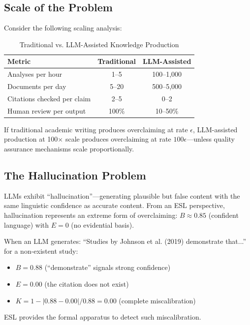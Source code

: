 \documentclass[11pt,a4paper]{article}
\begin{document}
\subsection{Scale of the Problem}

Consider the following scaling analysis:

\begin{table}[h]
\centering
\caption{Traditional vs. LLM-Assisted Knowledge Production}
\label{tab:scale}
\begin{tabular}{lcc}
\toprule
\textbf{Metric} & \textbf{Traditional} & \textbf{LLM-Assisted} \\
\midrule
Analyses per hour & 1--5 & 100--1,000 \\
Documents per day & 5--20 & 500--5,000 \\
Citations checked per claim & 2--5 & 0--2 \\
Human review per output & 100\% & 10--50\% \\
\bottomrule
\end{tabular}
\end{table}

If traditional academic writing produces overclaiming at rate $\epsilon$, LLM-assisted production at 100$\times$ scale produces overclaiming at rate $100\epsilon$---unless quality assurance mechanisms scale proportionally.

\subsection{The Hallucination Problem}

LLMs exhibit ``hallucination''---generating plausible but false content with the same linguistic confidence as accurate content. From an ESL perspective, hallucination represents an extreme form of overclaiming: $B \approx 0.85$ (confident language) with $E = 0$ (no evidential basis).

\begin{warningbox}[title={Hallucination as Extreme Overclaiming}]
When an LLM generates: ``Studies by Johnson et al. (2019) demonstrate that...'' for a non-existent study:

\begin{itemize}
    \item $B = 0.88$ (``demonstrate'' signals strong confidence)
    \item $E = 0.00$ (the citation does not exist)
    \item $K = 1 - |0.88 - 0.00| / 0.88 = 0.00$ (complete miscalibration)
\end{itemize}

ESL provides the formal apparatus to detect such miscalibration.
\end{warningbox}
\end{document}
